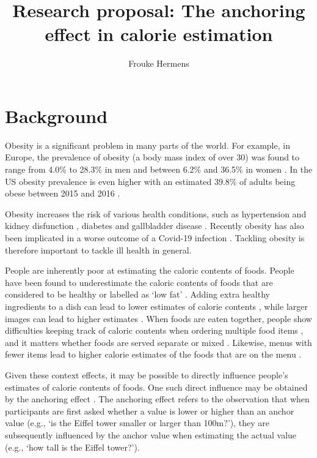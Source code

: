 \documentclass[a4paper,doc,natbib]{apa6}
\title{Research proposal: The anchoring effect in calorie estimation}
\author{Frouke Hermens}
\affiliation{Open University of the Netherlands}
\begin{document}
\maketitle

\section{Background}

Obesity is a significant problem in many parts of the world. For example, in Europe, the prevalence of obesity (a body mass index of over 30) was found to range from 4.0\% to 28.3\% in men and between 6.2\% and 36.5\% in women \citep{berghofer2008obesity}. In the US obesity prevalence is even higher with an estimated 39.8\% of adults being obese between 2015 and 2016 \citep{hales2017prevalence}. 

Obesity increases the risk of various health conditions, such as hypertension and kidney disfunction \citep{hall2019obesity}, diabetes \citep{schnurr2020obesity} and gallbladder disease \citep{zahra2019link}. Recently obesity has also been implicated in a worse outcome of a Covid-19 infection \citep{hussain2020obesity}. Tackling obesity is therefore important to tackle ill health in general.

People are inherently poor at estimating the caloric contents of foods. People have been found to underestimate the caloric contents of foods that are considered to be healthy \citep{chandon2007biasing} or labelled as `low fat' \citep{ebneter2013less}. Adding extra healthy ingredients to a dish can lead to lower estimates of calorie contents \citep{zhu2019extra}, while larger images can lead to higher estimates \citep{tal2021visual}. When foods are eaten together, people show difficulties keeping track of caloric contents when ordering multiple food items \citep{gustafson2019cognitive}, and it matters whether foods are served separate or mixed \citep{ai2021serving}. Likewise, menus with fewer items lead to higher calorie estimates of the foods that are on the menu \citep{kim2022impact}.

Given these context effects, it may be possible to directly influence people's estimates of calorie contents of foods. One such direct influence may be obtained by the anchoring effect \citep{furnham2011literature,tversky1974judgment}. The anchoring effect refers to the observation that when participants are first asked whether a value is lower or higher than an anchor value (e.g., `is the Eiffel tower smaller or larger than 100m?'), they are subsequently influenced by the anchor value when estimating the actual value (e.g., `how tall is the Eiffel tower?').
\end{document}
